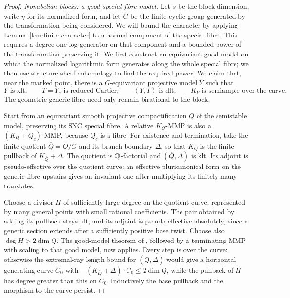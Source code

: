 \begin{proof}
\smallskip\noindent\textit{Nonabelian blocks: a good special-fibre model.}
Let $s$ be the block dimension, write $\eta$ for its normalized
form, and let $G$ be the finite cyclic group generated by the
transformation being considered. We will bound the character by
applying Lemma~\ref{lem:finite-character} to a normal component
of the special fibre. This requires a degree-one log generator on
that component and a bounded power of the transformation preserving
it. We first construct an equivariant good model on which the
normalized logarithmic form generates along the whole special
fibre; we then use structure-sheaf cohomology to find the required
power. We claim that, near the marked
point, there is a $G$-equivariant projective model $Y$ such that
\begin{equation}\label{eq:den-good-model}
 Y\text{ is klt},\qquad T=Y_c\text{ is reduced Cartier},
 \qquad (Y,T)\text{ is dlt},\qquad K_Y\text{ is semiample over the curve}.
\end{equation}
The geometric generic fibre need only remain birational to the
block.

Start from an equivariant smooth projective compactification $Q$ of
the semistable model, preserving its SNC special fibre.  A relative
$K_Q$-MMP is also a $(K_Q+Q_c)$-MMP, because $Q_c$ is a fibre.
For existence and termination, take the finite quotient
$\overline Q=Q/G$ and its branch boundary $\Delta$, so that
$K_Q$ is the finite pullback of $K_{\overline Q}+\Delta$.
The quotient is $\mathbb Q$-factorial and $(\overline Q,\Delta)$ is
klt.  Its adjoint is pseudo-effective over the quotient curve:
an effective pluricanonical form on the generic fibre upstairs
gives an invariant one after multiplying its finitely many
translates.

Choose a divisor $H$ of sufficiently large degree on the quotient
curve, represented by many general points with small rational
coefficients.  The pair obtained by adding its pullback stays klt,
and its adjoint is pseudo-effective absolutely, since a generic
section extends after a sufficiently positive base twist.  Choose
also $\deg H>2\dim Q$.  The good-model theorem of
\cite[Theorem~11.1]{LA}, followed by a terminating MMP with scaling
to that good model, now applies.  Every step is over the curve:
otherwise the extremal-ray length bound for
$(\overline Q,\Delta)$ would give a horizontal generating curve
$C_0$ with
$-(K_{\overline Q}+\Delta)\cdot C_0\leq2\dim Q$, while
the pullback of $H$ has degree greater than this on $C_0$.
Inductively the base pullback and the morphism to the curve persist.


\end{proof}
